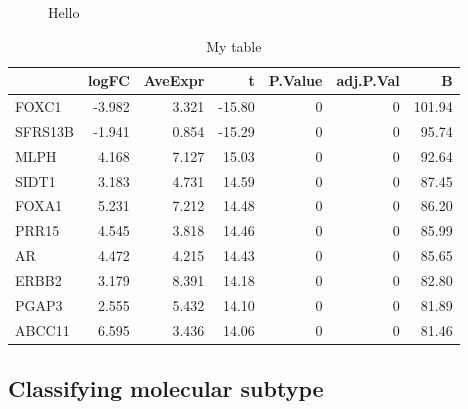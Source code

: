 \documentclass[10pt,twocolumn]{article}\usepackage[]{graphicx}\usepackage[]{color}
\newenvironment{knitrout}{}{} %
\begin{document}
\begin{knitrout}
\begin{figure}[ht]
{}

\caption[Hello]{Hello}\label{fig:unnamed-chunk-32}
\end{figure}


\end{knitrout}

\begin{knitrout}
\color{fgcolor}\begin{table}

\caption{\label{tab:unnamed-chunk-4}My table}
\centering
\begin{tabular}[t]{lrrrrrr}
\toprule
  & logFC & AveExpr & t & P.Value & adj.P.Val & B\\
\midrule
FOXC1 & -3.982 & 3.321 & -15.80 & 0 & 0 & 101.94\\
SFRS13B & -1.941 & 0.854 & -15.29 & 0 & 0 & 95.74\\
MLPH & 4.168 & 7.127 & 15.03 & 0 & 0 & 92.64\\
SIDT1 & 3.183 & 4.731 & 14.59 & 0 & 0 & 87.45\\
FOXA1 & 5.231 & 7.212 & 14.48 & 0 & 0 & 86.20\\
\addlinespace
PRR15 & 4.545 & 3.818 & 14.46 & 0 & 0 & 85.99\\
AR & 4.472 & 4.215 & 14.43 & 0 & 0 & 85.65\\
ERBB2 & 3.179 & 8.391 & 14.18 & 0 & 0 & 82.80\\
PGAP3 & 2.555 & 5.432 & 14.10 & 0 & 0 & 81.89\\
ABCC11 & 6.595 & 3.436 & 14.06 & 0 & 0 & 81.46\\
\bottomrule
\end{tabular}
\end{table}


\end{knitrout}

\subsection{Classifying molecular subtype} %
\end{document}
